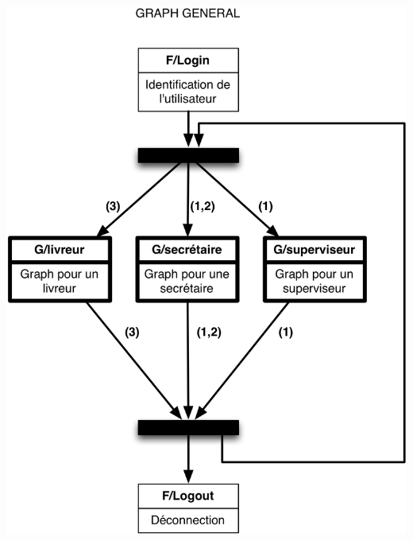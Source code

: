 \documentclass{report}
\begin{document}
\paragraph{}
~~\\
\begin{center}
\includegraphics[scale = 0.25]{images/general.jpg}
\end{center}
\end{document}
